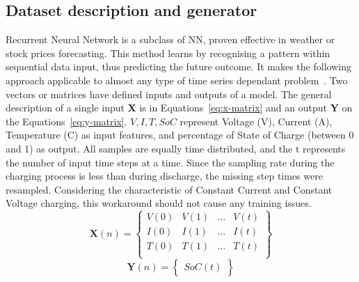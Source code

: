 \subsection{Dataset description and generator} \label{subsec:dataset}
Recurrent Neural Network is a subclass of NN, proven effective in weather or stock prices forecasting.
This method learns by recognising a pattern within sequential data input, thus predicting the future outcome.
It makes the following approach applicable to almost any type of time series dependant problem~\cite{anton_battery_2013}.
Two vectors or matrices have defined inputs and outputs of a model.
The general description of a single input \textbf{X} is in \mbox{Equations~\ref{eq:x-matrix}} and an output \textbf{Y} on the \mbox{Equations~\ref{eq:y-matrix}}.
$V, I, T, SoC$ represent Voltage (V), Current (A), Temperature (\textdegree{}C) as input features, and percentage of State of Charge (between 0 and 1) as output.
All samples are equally time distributed, and the t represents the number of input time steps at a time.
Since the sampling rate during the charging process is less than during discharge, the missing step times were resampled.
Considering the characteristic of Constant Current and Constant Voltage charging, this workaround should not cause any training issues.
\begin{equation}
    \textbf{X} \left (n  \right ) =
    \begin{Bmatrix}
        V \left (0  \right ) & V \left (1  \right ) & ... & V \left (t  \right )\\ 
        I \left (0  \right ) & I \left (1  \right ) & ... & I \left (t  \right )\\ 
        T \left (0  \right ) & T \left (1  \right ) & ... & T \left (t  \right )\\
    \end{Bmatrix}
    \label{eq:x-matrix}
\end{equation}
\begin{equation}
    \textbf{Y} \left (n  \right ) =
    \begin{Bmatrix}
        SoC \left (t  \right ) 
    \end{Bmatrix}
    \label{eq:y-matrix}
\end{equation}

